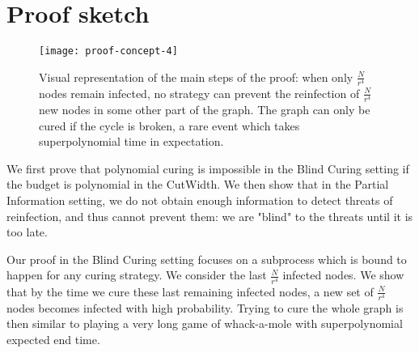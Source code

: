 \section{Proof sketch}

\begin{figure*}
\centering\texttt{[image: proof-concept-4]}
\caption{Visual representation of the main steps of the proof: when only $\frac{N}{r^4}$ nodes remain infected, no strategy can prevent the reinfection of $\frac{N}{r^4}$ new nodes in some other part of the graph. The graph can only be cured if the cycle is broken, a rare event which takes superpolynomial time in expectation.}
\end{figure*}
We first prove that polynomial curing is impossible in the Blind Curing setting if the budget is polynomial in the {\sc CutWidth}. We then show that in the Partial Information setting, we do not obtain enough information to detect threats of reinfection, and thus cannot prevent them: we are "blind" to the threats until it is too late.

Our proof in the Blind Curing setting focuses on a subprocess which is bound to happen for any curing strategy. We consider the last $\frac{N}{r^4}$ infected nodes. We show that by the time we cure these last remaining infected nodes, a new set of $\frac{N}{r^4}$ nodes becomes infected with high probability. Trying to cure the whole graph is then similar to playing a very long game of whack-a-mole with superpolynomial expected end time.

